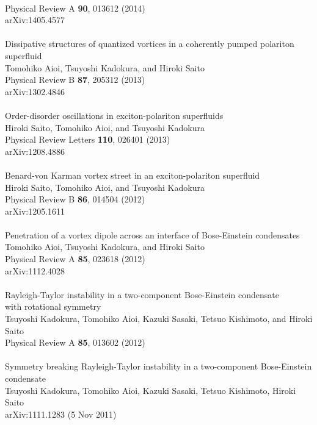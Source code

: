 \documentclass[12pt,a4paper]{report} %
\begin{document}
\\
Physical Review A {\bf 90}, 013612 (2014)
\\
arXiv:1405.4577
\\
\\
Dissipative structures of quantized vortices in a coherently pumped polariton superfluid 
\\
Tomohiko Aioi, Tsuyoshi Kadokura, and Hiroki Saito
\\
Physical Review B {\bf 87}, 205312 (2013)
\\
arXiv:1302.4846
\\
\\
Order-disorder oscillations in exciton-polariton superfluids 
\\
Hiroki Saito, Tomohiko Aioi, and Tsuyoshi Kadokura 
\\
Physical Review Letters {\bf 110}, 026401 (2013)
\\
arXiv:1208.4886
\\
\\
Benard-von Karman vortex street in an exciton-polariton superfluid 
\\
Hiroki Saito, Tomohiko Aioi, and Tsuyoshi Kadokura 
\\
Physical Review B {\bf 86}, 014504 (2012)
\\
arXiv:1205.1611
\\
\\
Penetration of a vortex dipole across an interface of Bose-Einstein condensates 
\\
Tomohiko Aioi, Tsuyoshi Kadokura, and Hiroki Saito 
\\
Physical Review A {\bf 85}, 023618 (2012)
\\
arXiv:1112.4028
\\
\\
Rayleigh-Taylor instability in a two-component Bose-Einstein condensate
\\
with rotational symmetry 
\\
Tsuyoshi Kadokura, Tomohiko Aioi, Kazuki Sasaki, Tetsuo Kishimoto, and Hiroki Saito 
\\
Physical Review A {\bf 85}, 013602 (2012) 
\\
\\
Symmetry breaking Rayleigh-Taylor instability in a two-component Bose-Einstein condensate
\\
Tsuyoshi Kadokura, Tomohiko Aioi, Kazuki Sasaki, Tetsuo Kishimoto, Hiroki Saito 
\\
arXiv:1111.1283 (5 Nov 2011)
\\
\end{document}
